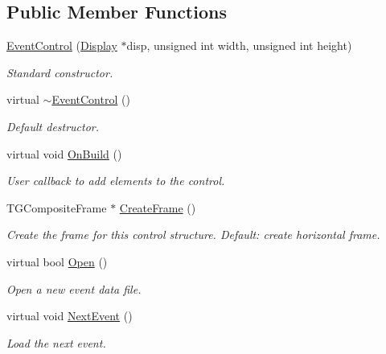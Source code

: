 \subsection*{Public Member Functions}
\begin{DoxyCompactItemize}
\item 
\hyperlink{class_d_d4hep_1_1_event_control_a5abad625ba8ddb768f2dff26ec06c987}{Event\+Control} (\hyperlink{class_d_d4hep_1_1_display}{Display} $\ast$disp, unsigned int width, unsigned int height)
\begin{DoxyCompactList}\small\item\em Standard constructor. \end{DoxyCompactList}\item 
virtual \hyperlink{class_d_d4hep_1_1_event_control_ad8fcc15169bd6829ac92497adf216b94}{$\sim$\+Event\+Control} ()
\begin{DoxyCompactList}\small\item\em Default destructor. \end{DoxyCompactList}\item 
virtual void \hyperlink{class_d_d4hep_1_1_event_control_ada9bb8f5e290f6acb6832208f407a53a}{On\+Build} ()
\begin{DoxyCompactList}\small\item\em User callback to add elements to the control. \end{DoxyCompactList}\item 
T\+G\+Composite\+Frame $\ast$ \hyperlink{class_d_d4hep_1_1_event_control_a10479ca8f5f5836f6e3a9c1367eea1fb}{Create\+Frame} ()
\begin{DoxyCompactList}\small\item\em Create the frame for this control structure. Default\+: create horizontal frame. \end{DoxyCompactList}\item 
virtual bool \hyperlink{class_d_d4hep_1_1_event_control_ac317c6010a8ee404fb90da3081a05d8d}{Open} ()
\begin{DoxyCompactList}\small\item\em Open a new event data file. \end{DoxyCompactList}\item 
virtual void \hyperlink{class_d_d4hep_1_1_event_control_ac176e09a639beea7cc010b5f66b7b129}{Next\+Event} ()
\begin{DoxyCompactList}\small\item\em Load the next event. \end{DoxyCompactList}\item 

\end{DoxyCompactItemize}
